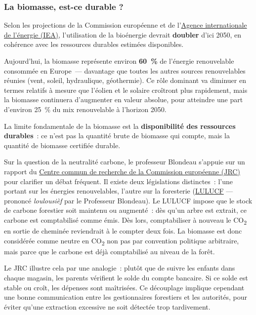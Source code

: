 \subsubsection{La biomasse, est-ce durable ?}

Selon les projections de la Commission européenne et de l'\href{https://www.ieabioenergy.com/}{Agence internationale de l'énergie (IEA)}, l'utilisation de la bioénergie devrait \textbf{doubler} d'ici 2050, en cohérence avec les ressources durables estimées disponibles.

Aujourd'hui, la biomasse représente environ \textbf{60~\%} de l'énergie renouvelable consommée en Europe~--- davantage que toutes les autres sources renouvelables réunies (vent, soleil, hydraulique, géothermie). Ce rôle dominant va diminuer en termes relatifs à mesure que l'éolien et le solaire croîtront plus rapidement, mais la biomasse continuera d'augmenter en valeur absolue, pour atteindre une part d'environ 25~\% du mix renouvelable à l'horizon 2050.

La limite fondamentale de la biomasse est la \textbf{disponibilité des ressources durables}~: ce n'est pas la quantité brute de biomasse qui compte, mais la quantité de biomasse certifiée durable.

Sur la question de la neutralité carbone, le professeur Blondeau s'appuie sur un rapport du \href{https://publications.jrc.ec.europa.eu/repository/handle/JRC122719}{Centre commun de recherche de la Commission européenne (JRC)} pour clarifier un débat fréquent. Il existe deux législations distinctes~: l'une portant sur les énergies renouvelables, l'autre sur la foresterie (\href{https://ec.europa.eu/clima/eu-action/forests-and-agriculture/land-use-and-forestry-regulation-2021-2030_en}{LULUCF} --- prononcé \textit{loulousièf} par le Professeur Blondeau). Le LULUCF impose que le stock de carbone forestier soit maintenu ou augmenté~: dès qu'un arbre est extrait, ce carbone est comptabilisé comme émis. Dès lors, comptabiliser à nouveau le CO\textsubscript{2} en sortie de cheminée reviendrait à le compter deux fois. La biomasse est donc considérée comme neutre en CO\textsubscript{2} non pas par convention politique arbitraire, mais parce que le carbone est déjà comptabilisé au niveau de la forêt.

Le JRC illustre cela par une analogie~: plutôt que de suivre les enfants dans chaque magasin, les parents vérifient le solde du compte bancaire. Si ce solde est stable ou croît, les dépenses sont maîtrisées. Ce découplage implique cependant une bonne communication entre les gestionnaires forestiers et les autorités, pour éviter qu'une extraction excessive ne soit détectée trop tardivement.

